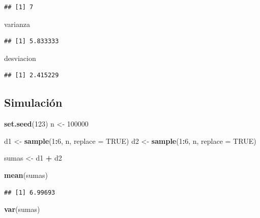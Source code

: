 \documentclass[
]{article}
\newenvironment{Shaded}{\begin{snugshade}}{\end{snugshade}}
\newcommand{\AttributeTok}[1]{\textcolor[rgb]{0.13,0.29,0.53}{#1}}
\newcommand{\ConstantTok}[1]{\textcolor[rgb]{0.56,0.35,0.01}{#1}}
\newcommand{\DecValTok}[1]{\textcolor[rgb]{0.00,0.00,0.81}{#1}}
\newcommand{\FunctionTok}[1]{\textcolor[rgb]{0.13,0.29,0.53}{\textbf{#1}}}
\newcommand{\NormalTok}[1]{#1}
\newcommand{\OtherTok}[1]{\textcolor[rgb]{0.56,0.35,0.01}{#1}}
\newcommand{\SpecialCharTok}[1]{\textcolor[rgb]{0.81,0.36,0.00}{\textbf{#1}}}
\begin{document}
\begin{verbatim}
## [1] 7
\end{verbatim}

\begin{Shaded}
\begin{Highlighting}[]
\NormalTok{varianza}
\end{Highlighting}
\end{Shaded}

\begin{verbatim}
## [1] 5.833333
\end{verbatim}

\begin{Shaded}
\begin{Highlighting}[]
\NormalTok{desviacion}
\end{Highlighting}
\end{Shaded}

\begin{verbatim}
## [1] 2.415229
\end{verbatim}

\subsection{Simulación}\label{simulaciuxf3n-1}

\begin{Shaded}
\begin{Highlighting}[]
\FunctionTok{set.seed}\NormalTok{(}\DecValTok{123}\NormalTok{)}
\NormalTok{n }\OtherTok{\textless{}{-}} \DecValTok{100000}

\NormalTok{d1 }\OtherTok{\textless{}{-}} \FunctionTok{sample}\NormalTok{(}\DecValTok{1}\SpecialCharTok{:}\DecValTok{6}\NormalTok{, n, }\AttributeTok{replace =} \ConstantTok{TRUE}\NormalTok{)}
\NormalTok{d2 }\OtherTok{\textless{}{-}} \FunctionTok{sample}\NormalTok{(}\DecValTok{1}\SpecialCharTok{:}\DecValTok{6}\NormalTok{, n, }\AttributeTok{replace =} \ConstantTok{TRUE}\NormalTok{)}

\NormalTok{sumas }\OtherTok{\textless{}{-}}\NormalTok{ d1 }\SpecialCharTok{+}\NormalTok{ d2}

\FunctionTok{mean}\NormalTok{(sumas)}
\end{Highlighting}
\end{Shaded}

\begin{verbatim}
## [1] 6.99693
\end{verbatim}

\begin{Shaded}
\begin{Highlighting}[]
\FunctionTok{var}\NormalTok{(sumas)}
\end{Highlighting}
\end{Shaded}
\end{document}
